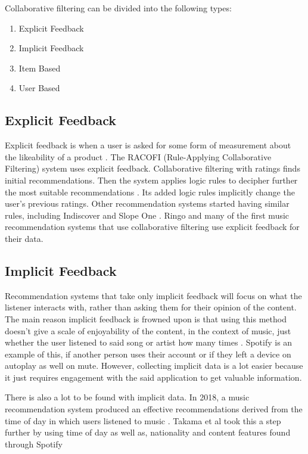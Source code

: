 Collaborative filtering can be divided into the following types:

\begin{enumerate}
	\item Explicit Feedback
	\item Implicit Feedback
	\item Item Based
	\item User Based
\end{enumerate}




\subsection{Explicit Feedback}

 Explicit feedback is when a user is asked for some form of measurement about the likeability of a product \citep{celma_recommendation_2010}. The RACOFI (Rule-Applying Collaborative Filtering) system uses explicit feedback. Collaborative filtering with ratings finds initial recommendations. Then the system applies logic rules to decipher further the most suitable recommendations \citep{anderson_racofi_2003}.  Its added logic rules implicitly change the user’s previous ratings. Other recommendation systems started having similar rules, including Indiscover and Slope One \citep{celma_music_2010, lemire_slope_2007}. Ringo and many of the first music recommendation systems that use collaborative filtering use explicit feedback for their data. 

\subsection{Implicit Feedback}

Recommendation systems that take only implicit feedback will focus on what the listener interacts with, rather than asking them for their opinion of the content. The main reason implicit feedback is frowned upon is that using this method doesn't give a scale of enjoyability of the content, in the context of music, just whether the user listened to said song or artist how many times \citep{celma_recommendation_2010}. Spotify is an example of this, if another person uses their account or if they left a device on autoplay as well on mute. However, collecting implicit data is a lot easier because it just requires engagement with the said application to get valuable information. 

There is also a lot to be found with implicit data. In 2018, a music recommendation system produced an effective recommendations derived from the time of day in which users listened to music \citep{sanchez-moreno_incorporating_2018}. Takama et al took this a step further by using time of day as well as, nationality and content features found through Spotify \citep{takama_context-aware_2021} 

